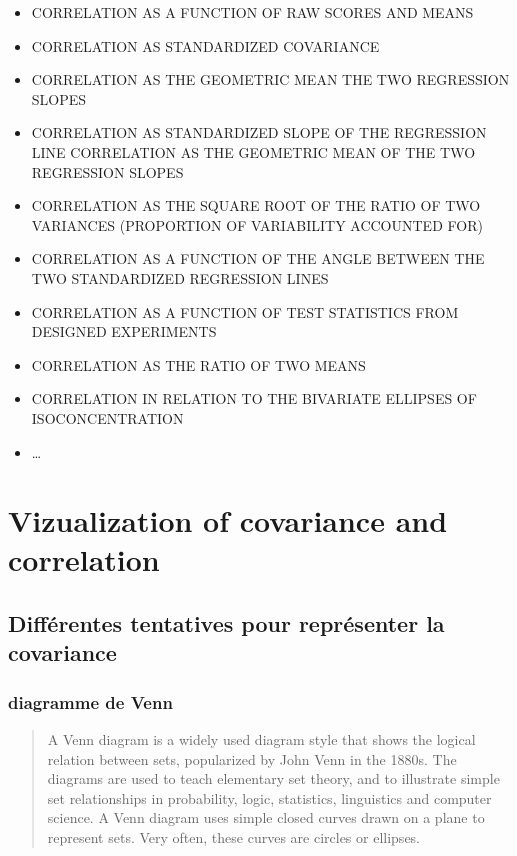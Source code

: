 \documentclass[
]{report}
\providecommand{\tightlist}{%
  \setlength{\itemsep}{0pt}\setlength{\parskip}{0pt}}
\begin{document}
\begin{itemize}
\tightlist
\item
  CORRELATION AS A FUNCTION OF RAW SCORES AND MEANS
\item
  CORRELATION AS STANDARDIZED COVARIANCE
\item
  CORRELATION AS THE GEOMETRIC MEAN THE TWO REGRESSION SLOPES
\item
  CORRELATION AS STANDARDIZED SLOPE OF THE REGRESSION LINE CORRELATION AS THE GEOMETRIC MEAN OF THE TWO REGRESSION SLOPES
\item
  CORRELATION AS THE SQUARE ROOT OF THE RATIO OF TWO VARIANCES (PROPORTION OF VARIABILITY ACCOUNTED FOR)
\item
  CORRELATION AS A FUNCTION OF THE ANGLE BETWEEN THE TWO STANDARDIZED REGRESSION LINES
\item
  CORRELATION AS A FUNCTION OF TEST STATISTICS FROM DESIGNED EXPERIMENTS
\item
  CORRELATION AS THE RATIO OF TWO MEANS
\item
  CORRELATION IN RELATION TO THE BIVARIATE ELLIPSES OF ISOCONCENTRATION
\item
  \ldots{}
\end{itemize}

\hypertarget{vizualization-of-covariance-and-correlation}{%
\chapter{Vizualization of covariance and correlation}\label{vizualization-of-covariance-and-correlation}}

\hypertarget{diffuxe9rentes-tentatives-pour-repruxe9senter-la-covariance}{%
\section{Différentes tentatives pour représenter la covariance}\label{diffuxe9rentes-tentatives-pour-repruxe9senter-la-covariance}}

\hypertarget{diagramme-de-venn}{%
\subsection{diagramme de Venn}\label{diagramme-de-venn}}

\begin{quote}
A Venn diagram is a widely used diagram style that shows the logical relation between sets, popularized by John Venn in the 1880s. The diagrams are used to teach elementary set theory, and to illustrate simple set relationships in probability, logic, statistics, linguistics and computer science. A Venn diagram uses simple closed curves drawn on a plane to represent sets. Very often, these curves are circles or ellipses.
\end{quote}
\end{document}
